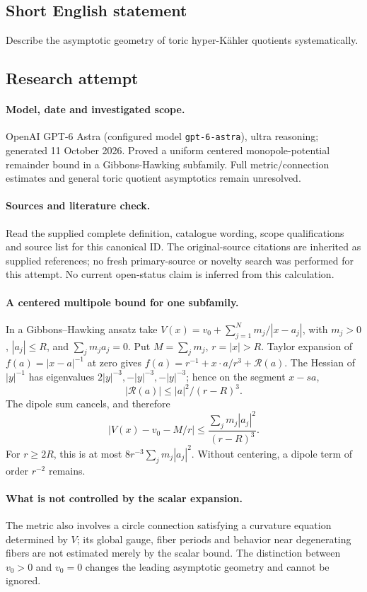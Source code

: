 \documentclass[11pt]{article}
\begin{document}
\subsection{Short English statement}
Describe the asymptotic geometry of toric hyper-Kähler quotients systematically.
\subsection{Research attempt}
\paragraph{Model, date and investigated scope.}
OpenAI GPT-6 Astra (configured model \texttt{gpt-6-astra}), ultra reasoning; generated 11 October 2026. Proved a uniform centered monopole-potential remainder bound in a Gibbons-Hawking subfamily. Full metric/connection estimates and general toric quotient asymptotics remain unresolved.

\paragraph{Sources and literature check.}
Read the supplied complete definition, catalogue wording, scope qualifications and source list for this canonical ID. The original-source citations are inherited as supplied references; no fresh primary-source or novelty search was performed for this attempt. No current open-status claim is inferred from this calculation.

\paragraph{A centered multipole bound for one subfamily.}In a Gibbons--Hawking ansatz take \(V(x)=v_0+\sum_{j=1}^Nm_j/|x-a_j|\), with \(m_j>0\), \(|a_j|\le R\), and \(\sum_jm_ja_j=0\). Put \(M=\sum_jm_j\), \(r=|x|>R\). Taylor expansion of \(f(a)=|x-a|^{-1}\) at zero gives \(f(a)=r^{-1}+x\cdot a/r^3+\mathcal R(a)\). The Hessian of \(|y|^{-1}\) has eigenvalues \(2|y|^{-3},-|y|^{-3},-|y|^{-3}\); hence on the segment \(x-sa\),
\[|\mathcal R(a)|\le |a|^2/(r-R)^3.
\]
The dipole sum cancels, and therefore
\[\left|V(x)-v_0-M/r\right|\le\frac{\sum_jm_j|a_j|^2}{(r-R)^3}.
\]
For \(r\ge2R\), this is at most \(8r^{-3}\sum_jm_j|a_j|^2\). Without centering, a dipole term of order \(r^{-2}\) remains.
\paragraph{What is not controlled by the scalar expansion.}The metric also involves a circle connection satisfying a curvature equation determined by \(V\); its global gauge, fiber periods and behavior near degenerating fibers are not estimated merely by the scalar bound. The distinction between \(v_0>0\) and \(v_0=0\) changes the leading asymptotic geometry and cannot be ignored.
\end{document}
